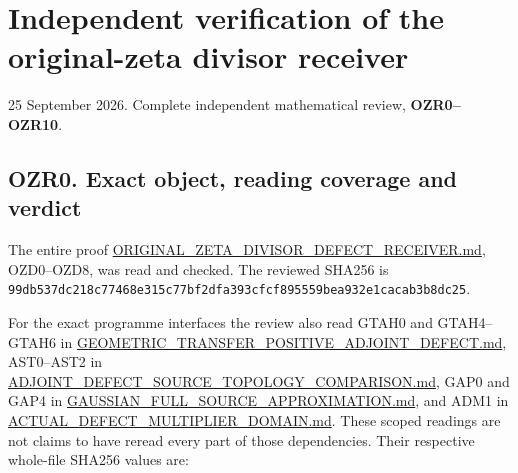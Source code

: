 \section{Independent verification of the original-zeta divisor
receiver}\label{independent-verification-of-the-original-zeta-divisor-receiver}

25 September 2026. Complete independent mathematical review,
\textbf{OZR0--OZR10}.

\subsection{OZR0. Exact object, reading coverage and
verdict}\label{ozr0.-exact-object-reading-coverage-and-verdict}

The entire proof
\href{https://github.com/KokunoYumeto/zeta-function-research-reader/blob/main/workbenches/splitzero-tandem/continuations/20260925-full-source-tensor-and-original-divisor/identity/ORIGINAL_ZETA_DIVISOR_DEFECT_RECEIVER.md}{ORIGINAL\_ZETA\_DIVISOR\_DEFECT\_RECEIVER.md},
OZD0--OZD8, was read and checked. The reviewed SHA256 is
\texttt{99db537dc218c77468e315c77bf2dfa393cfcf895559bea932e1cacab3b8dc25}.

For the exact programme interfaces the review also read GTAH0 and
GTAH4--GTAH6 in
\href{https://github.com/KokunoYumeto/zeta-function-research-reader/blob/36a82ecca98addb8a98b48204e349737856c7223/workbenches/splitzero-tandem/continuations/20260924-cohomology-weight-and-character-lifts/geometric-positive-quotient/GEOMETRIC_TRANSFER_POSITIVE_ADJOINT_DEFECT.md}{GEOMETRIC\_TRANSFER\_POSITIVE\_ADJOINT\_DEFECT.md},
AST0--AST2 in
\href{https://github.com/KokunoYumeto/zeta-function-research-reader/blob/main/workbenches/splitzero-tandem/continuations/20260925-full-source-tensor-and-original-divisor/gct/ADJOINT_DEFECT_SOURCE_TOPOLOGY_COMPARISON.md}{ADJOINT\_DEFECT\_SOURCE\_TOPOLOGY\_COMPARISON.md},
GAP0 and GAP4 in
\href{https://github.com/KokunoYumeto/zeta-function-research-reader/blob/main/workbenches/splitzero-tandem/continuations/20260925-full-source-tensor-and-original-divisor/identity/GAUSSIAN_FULL_SOURCE_APPROXIMATION.md}{GAUSSIAN\_FULL\_SOURCE\_APPROXIMATION.md},
and ADM1 in
\href{https://github.com/KokunoYumeto/zeta-function-research-reader/blob/main/workbenches/splitzero-tandem/continuations/20260925-full-source-tensor-and-original-divisor/identity/ACTUAL_DEFECT_MULTIPLIER_DOMAIN.md}{ACTUAL\_DEFECT\_MULTIPLIER\_DOMAIN.md}.
These scoped readings are not claims to have reread every part of those
dependencies. Their respective whole-file SHA256 values are:

